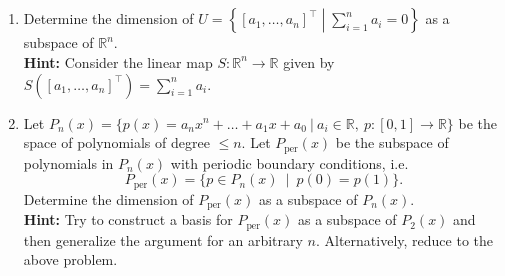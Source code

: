 \documentclass[12pt,letterpaper]{article}
\theoremstyle{plain}
\theoremstyle{definition}
\begin{document}
\begin{enumerate}[{\bf1.}]
\item Determine the dimension of $U=\left\{[a_1,\ldots,a_n]^\top \middle| \sum_{i=1}^n a_i=0\right\}$ as a subspace of $\mathbb{R}^n$. \\

{\bf \noindent Hint: }Consider the linear map $S:\mathbb{R}^n\rightarrow \mathbb{R}$ given by $S([a_1,\ldots, a_n]^\top)=\sum_{i=1}^na_i$. \\

\item Let $P_{n}(x)=\{p(x)=a_nx^n+\ldots+a_1x+a_0\ |\ a_i\in \mathbb{R},\ p:[0,1]\rightarrow \mathbb{R}\}$ be the space of polynomials of degree $\leq n$. Let $P_{\text{per}}(x)$ be the subspace of polynomials in $P_{n}(x)$ with periodic boundary conditions, i.e. 
\[P_{\text{per}}(x)=\{p\in P_{n}(x)\ \mid\  p(0)=p(1)\}.\]
Determine the dimension of $P_{\text{per}}(x)$ as a subspace of $P_n(x)$. \\

{\bf \noindent Hint: }Try to construct a basis for $P_{\text{per}}(x)$ as a subspace of $P_{2}(x)$ and then generalize the argument for an arbitrary $n$. Alternatively, reduce to the above problem. 
\end{enumerate}
\end{document}

